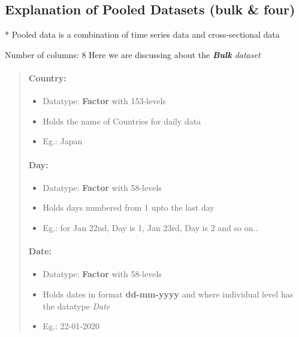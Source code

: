 \documentclass[11pt]{article}
\providecommand{\tightlist}{%
      \setlength{\itemsep}{0pt}\setlength{\parskip}{0pt}}
\begin{document}
    \hypertarget{explanation-of-pooled-datasets-bulk-four}{%
\subsection{Explanation of Pooled Datasets (bulk \&
four)}\label{explanation-of-pooled-datasets-bulk-four}}

 * Pooled data is a combination of time series data and cross-sectional
data

Number of columns: 8 Here we are discussing about the
\emph{\textbf{Bulk} dataset}

\begin{quote}
\mbox{}%
\hypertarget{country}{%
\paragraph{Country:}\label{country}}

\begin{itemize}
\tightlist
\item
  Datatype: \textbf{Factor} with 153-levels 
\item
  Holds the name of Countries for daily data
\item
  Eg.: Japan
\end{itemize}

\mbox{}%
\hypertarget{day}{%
\paragraph{Day:}\label{day}}

\begin{itemize}
\tightlist
\item
  Datatype: \textbf{Factor} with 58-levels 
\item
  Holds days numbered from 1 upto the last day 
\item
  Eg.: for Jan 22nd, Day is 1, Jan 23rd, Day is 2 and so on..
\end{itemize}

\mbox{}%
\hypertarget{date}{%
\paragraph{Date:}\label{date}}

\begin{itemize}
\tightlist
\item
  Datatype: \textbf{Factor} with 58-levels 
\item
  Holds dates in format \textbf{dd-mm-yyyy} and where individual level
  has the datatype \emph{Date} 
\item
  Eg.: 22-01-2020
\end{itemize}


\end{quote}
\end{document}
